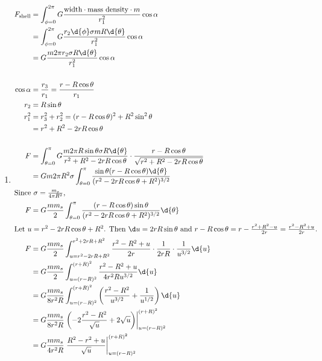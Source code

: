 \documentclass[solutions]{esg8012pset}
\begin{document}
  \begin{enumerate}[1)]
    \item \begin{align*}
     F_{\text{shell}} & = \int_{\phi=0}^{2\pi}G \frac{\text{width}\cdot \text{mass density}\cdot m}{r_1^2}\cos\alpha \\
      & = \int_{\phi=0}^{2\pi}G \frac{r_2\d{\phi}\sigma m R\d{\theta}}{r_1^2}\cos\alpha \\
      & = G \frac{m 2\pi r_2 \sigma  R\d{\theta}}{r_1^2}\cos\alpha \\
      \\
    \cos\alpha & = \frac{r_3}{r_1} = \frac{r - R\cos\theta}{r_1} \\
    r_2 & = R\sin\theta \\
    r_1^2 & = r_3^2 + r_2^2  = (r-R\cos\theta)^2+R^2\sin^2\theta \\
     & = r^2 + R^2 - 2rR\cos\theta \\
    \\
    F & = \int_{\theta = 0}^{\pi} G \frac{m 2\pi R\sin\theta \sigma  R\d{\theta}}{r^2 + R^2 - 2rR\cos\theta}\cdot \frac{r - R\cos\theta}{\sqrt{r^2 + R^2 - 2rR\cos\theta}} \\
     & = G m 2\pi R^2 \sigma \int_{\theta = 0}^{\pi} \frac{\sin\theta(r-R\cos\theta) \d{\theta}}{(r^2 - 2rR\cos\theta + R^2)^{3/2}} \\
    \intertext{Since $\sigma = \frac{m_s}{4\pi R^2}$,}
    F & = G \frac{m m_s}{2} \int_{\theta = 0}^{\pi} \frac{(r-R\cos\theta)\sin\theta}{(r^2 - 2rR\cos\theta + R^2)^{3/2}} \d{\theta} \\
    \intertext{Let $u=r^2-2rR\cos\theta + R^2$.  Then $\d u = 2rR\sin\theta$ and $r-R\cos\theta = r - \frac{r^2 + R^2 - u}{2r} = \frac{r^2 - R^2 + u}{2r}$.}
    F & = G \frac{m m_s}{2} \int_{u = r^2-2rR+R^2}^{r^2+2rR+R^2} \frac{r^2 - R^2 + u}{2r} \cdot \frac{1}{2rR} \cdot  \frac{1}{u^{3/2}} \d{u} \\
     & = G \frac{m m_s}{2} \int_{u = (r-R)^2}^{(r+R)^2} \frac{r^2 - R^2 + u}{4r^2Ru^{3/2}} \d{u} \\
     & = G \frac{m m_s}{8r^2R} \int_{u = (r-R)^2}^{(r+R)^2} \left(\frac{r^2 - R^2}{u^{3/2}} + \frac{1}{u^{1/2}}\right) \d{u} \\
     & = G \frac{m m_s}{8r^2R} \left.\left(-2\frac{r^2 - R^2}{\sqrt{u}} + 2\sqrt{u}\right)\right|_{u = (r-R)^2}^{(r+R)^2} \\
     & = G \frac{m m_s}{4r^2R} \left.\frac{R^2 - r^2 + u}{\sqrt{u}}\right|_{u = (r-R)^2}^{(r+R)^2} \\

\end{align*}
\end{enumerate}
\end{document}
